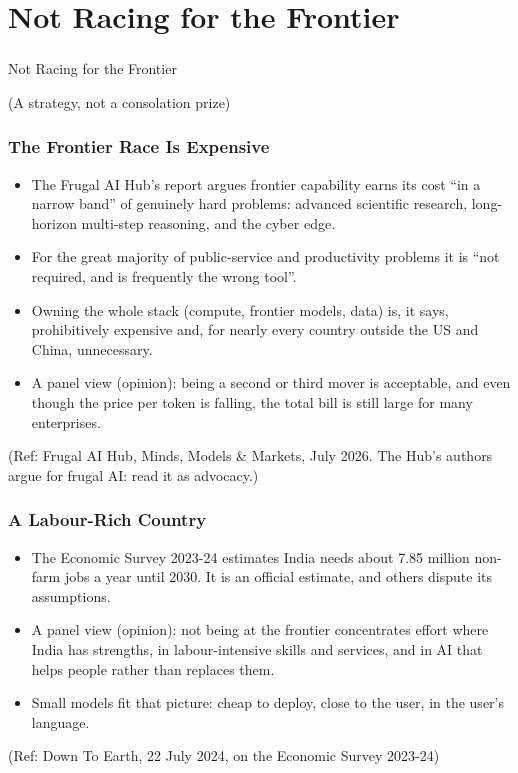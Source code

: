 
\section[Frontier]{Not Racing for the Frontier}

\begin{frame}[fragile]\frametitle{}
\begin{center}
{\Large Not Racing for the Frontier}

\medskip
{\small (A strategy, not a consolation prize)}
\end{center}
\end{frame}

\begin{frame}[fragile]\frametitle{The Frontier Race Is Expensive}
\begin{itemize}
\item The Frugal AI Hub's report argues frontier capability earns its cost ``in a narrow band'' of genuinely hard problems: advanced scientific research, long-horizon multi-step reasoning, and the cyber edge.
\item For the great majority of public-service and productivity problems it is ``not required, and is frequently the wrong tool''.
\item Owning the whole stack (compute, frontier models, data) is, it says, prohibitively expensive and, for nearly every country outside the US and China, unnecessary.
\item A panel view (opinion): being a second or third mover is acceptable, and even though the price per token is falling, the total bill is still large for many enterprises.
\end{itemize}
{\tiny (Ref: Frugal AI Hub, Minds, Models \& Markets, July 2026. The Hub's authors argue for frugal AI: read it as advocacy.)}
\end{frame}

\begin{frame}[fragile]\frametitle{A Labour-Rich Country}
\begin{itemize}
\item The Economic Survey 2023-24 estimates India needs about 7.85 million non-farm jobs a year until 2030. It is an official estimate, and others dispute its assumptions.
\item A panel view (opinion): not being at the frontier concentrates effort where India has strengths, in labour-intensive skills and services, and in AI that helps people rather than replaces them.
\item Small models fit that picture: cheap to deploy, close to the user, in the user's language.
\end{itemize}
{\tiny (Ref: Down To Earth, 22 July 2024, on the Economic Survey 2023-24)}
\end{frame}

